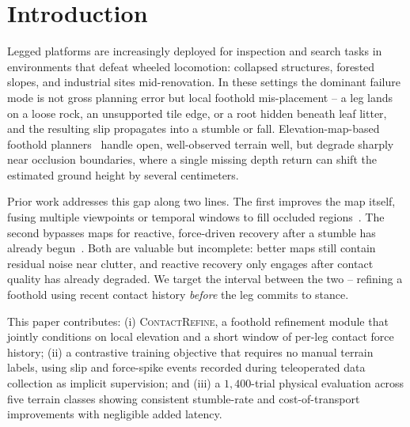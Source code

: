 \section{Introduction}
Legged platforms are increasingly deployed for inspection and search tasks in environments
that defeat wheeled locomotion: collapsed structures, forested slopes, and industrial sites
mid-renovation. In these settings the dominant failure mode is not gross planning error but
local foothold mis-placement -- a leg lands on a loose rock, an unsupported tile edge, or a
root hidden beneath leaf litter, and the resulting slip propagates into a stumble or fall.
Elevation-map-based foothold planners~\cite{singh2018survey,tanaka2023perception} handle
open, well-observed terrain well, but degrade sharply near occlusion boundaries, where a
single missing depth return can shift the estimated ground height by several centimeters.

Prior work addresses this gap along two lines. The first improves the map itself, fusing
multiple viewpoints or temporal windows to fill occluded regions~\cite{tanaka2023perception}.
The second bypasses maps for reactive, force-driven recovery after a stumble has already
begun~\cite{oduya2020reactive}. Both are valuable but incomplete: better maps still contain
residual noise near clutter, and reactive recovery only engages after contact quality has
already degraded. We target the interval between the two -- refining a foothold using recent
contact history \emph{before} the leg commits to stance.

This paper contributes: (i) \textsc{ContactRefine}, a foothold refinement module that jointly
conditions on local elevation and a short window of per-leg contact force history; (ii) a
contrastive training objective that requires no manual terrain labels, using slip and
force-spike events recorded during teleoperated data collection as implicit supervision; and
(iii) a $1{,}400$-trial physical evaluation across five terrain classes showing consistent
stumble-rate and cost-of-transport improvements with negligible added latency.
